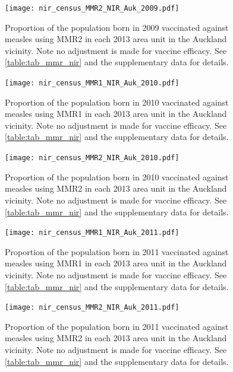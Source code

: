 \documentclass{article}
\begin{document}
% 
\begin{figure}
\begin{center}
    \texttt{[image: nir\_census\_MMR2\_NIR\_Auk\_2009.pdf]}
 \end{center}
    \caption{Proportion of the population born in 2009 vaccinated against measles using MMR2 in each 2013 area unit in the Auckland vicinity. Note no adjustment is made for vaccine efficacy. See \autoref{table:tab_mmr_nir} and the supplementary data for details.}
\label{fig:fig22009_a}
\end{figure}
% 
% 
\begin{figure}
\begin{center}
    \texttt{[image: nir\_census\_MMR1\_NIR\_Auk\_2010.pdf]}
\end{center}
    \caption{Proportion of the population born in 2010 vaccinated against measles using MMR1 in each 2013 area unit in the Auckland vicinity. Note no adjustment is made for vaccine efficacy. See \autoref{table:tab_mmr_nir} and the supplementary data for details.}
\label{fig:fig12010_a}
\end{figure}
% 
% 
\begin{figure}
\begin{center}
    \texttt{[image: nir\_census\_MMR2\_NIR\_Auk\_2010.pdf]}
 \end{center}
    \caption{Proportion of the population born in 2010 vaccinated against measles using MMR2 in each 2013 area unit in the Auckland vicinity. Note no adjustment is made for vaccine efficacy. See \autoref{table:tab_mmr_nir} and the supplementary data for details.}
\label{fig:fig22010_a}
\end{figure}
% 
% 
\begin{figure}
\begin{center}
    \texttt{[image: nir\_census\_MMR1\_NIR\_Auk\_2011.pdf]}
 \end{center}
    \caption{Proportion of the population born in 2011 vaccinated against measles using MMR1 in each 2013 area unit in the Auckland vicinity. Note no adjustment is made for vaccine efficacy. See \autoref{table:tab_mmr_nir} and the supplementary data for details.}
\label{fig:fig12011_a}
\end{figure}
% 
% 
\begin{figure}
\begin{center}
    \texttt{[image: nir\_census\_MMR2\_NIR\_Auk\_2011.pdf]}
 \end{center}
    \caption{Proportion of the population born in 2011 vaccinated against measles using MMR2 in each 2013 area unit in the Auckland vicinity. Note no adjustment is made for vaccine efficacy. See \autoref{table:tab_mmr_nir} and the supplementary data for details.}
\label{fig:fig22011_a}
\end{figure}
\end{document}
